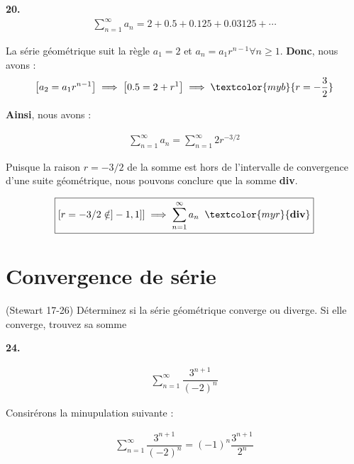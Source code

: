 \documentclass{report}
\begin{document}
    
    \noindent
    \textbf{20.} 
    \begin{align*}
            \sum_{n=1}^{\infty }a_n = 2 + 0.5 + 0.125 + 0.03125 + \cdots 
    \end{align*}

    La série géométrique suit la règle $a_1 = 2$ et $a_n = a_1r^{n-1} \forall n \geq 1$.
    \textbf{Donc}, nous avons :
    \begin{align*}
        \left[ a_2 = a_1r^{n-1}  \right] \implies 
        \left[ 0.5 = 2 + r^{1} \right] \implies 
        \textcolor{myb}{r =  -\frac{3}{2}} 
    \end{align*}

    \textbf{Ainsi}, nous avons :
    
    \begin{align*}
        \sum_{n=1}^{\infty }a_n = \sum_{n=1}^{\infty } 2r^{-3/2}
    \end{align*}

    Puisque la raison $r = -3/2$ de la somme est hors de l'intervalle de convergence 
    d'une suite géométrique, nous pouvons conclure que la somme \textcolor{myr}{\textbf{div}}.

    \begin{align*}
        \boxed{
        \left[ r = -3/2 \notin ]-1, 1] \right] \implies \sum_{n=1}^{\infty }a_n 
        \;\; \textcolor{myr}{\textbf{div}} 
    }
    \end{align*}

    \section{Convergence de série}
    \begin{Exercice}{(Stewart 17-26)}{}
        Déterminez si la série géométrique converge ou diverge.
        Si elle converge, trouvez sa somme
    \end{Exercice}


    \noindent \textbf{24.}                    

    \begin{align*}
         \sum\limits_{n=1}^{\infty } \dfrac{3^{n+1}}{(-2)^n}
    \end{align*}

    Consirérons la minupulation suivante :

    \begin{align*}
         \sum\limits_{n=1}^{\infty } \dfrac{3^{n+1}}{(-2)^n} = 
         (-1)^n \dfrac{3^{n+1}}{2^n}
    \end{align*}
\end{document}
